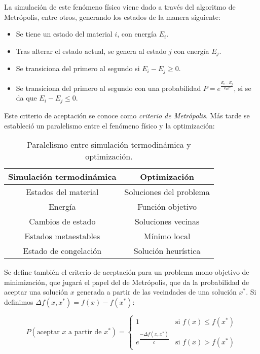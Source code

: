 La simulación de este fenómeno físico viene dado a través del algoritmo de Metrópolis, entre otros, generando los estados de la manera siguiente:
\begin{itemize}
    \item Se tiene un estado del material $i$, con energía $E_i$.
    \item Tras alterar el estado actual, se genera al estado $j$ con energía $E_j$.
    \item Se transiciona del primero al segundo si $E_i - E_j \geq 0$.
    \item Se transiciona del primero al segundo con una probabilidad $P = e^{\frac{E_i - E_j}{k_BT}}$, si se da que $E_i - E_j \leq 0$.
\end{itemize}
Este criterio de aceptación se conoce como \textsl{criterio de Metrópolis}.
Más tarde se estableció un paralelismo entre el fenómeno físico y la optimización:
\begin{table}[h]
    \centering
    \begin{tabular}{|c|c|}
        \hline
        \textbf{Simulación termodinámica} & \textbf{Optimización} \\
        \hline
        Estados del material & Soluciones del problema \\
        \hline
        Energía & Función objetivo \\
        \hline
        Cambios de estado & Soluciones vecinas \\
        \hline
        Estados metaestables & Mínimo local \\
        \hline
        Estado de congelación & Solución heurística \\
        \hline
    \end{tabular}
    \caption{Paralelismo entre simulación termodinámica y optimización.}
    \label{tab:4.1}
\end{table}

Se define también el criterio de aceptación para un problema mono-objetivo de minimización, que jugará el papel del de Metrópolis, que da la probabilidad de aceptar una solución $x$ generada a partir de las vecindades de una solución $x^*$. Si definimos $\Delta f(x, x^*) = f(x) - f(x^*)$:

\begin{equation}
    P(\text{aceptar } x \text{ a partir de } x^*) = 
    \begin{cases} 
        1 & \text{si } f(x) \leq f(x^*) \\ 
        e^{\dfrac{-\Delta f(x, x^*)}{c}} & \text{si } f(x) > f(x^*) 
    \end{cases}
    \label{ec:4.2}
\end{equation}

